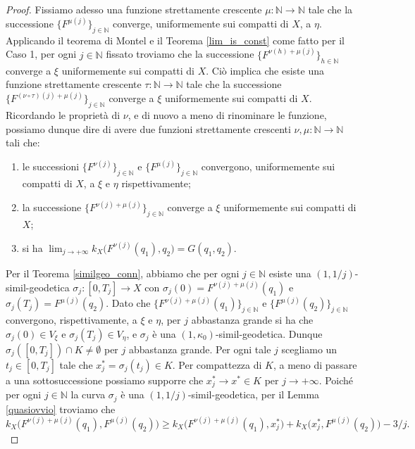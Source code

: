 \begin{proof}
    Fissiamo adesso una funzione strettamente crescente $\mu:\mathbb{N}\longrightarrow\mathbb{N}$ tale che la successione $\{F^{\mu(j)}\}_{j\in\mathbb{N}}$ converge, uniformemente sui compatti di $X$, a $\eta$. Applicando il teorema di Montel e il Teorema \ref{lim_is_const} come fatto per il Caso 1, per ogni $j\in\mathbb{N}$ fissato troviamo che la successione $\{F^{\nu(h)+\mu(j)}\}_{h\in\mathbb{N}}$ converge a $\xi$ uniformemente sui compatti di $X$. Ciò implica che esiste una funzione strettamente crescente $\tau:\mathbb{N}\longrightarrow\mathbb{N}$ tale che la successione $\{F^{(\nu\circ\tau)(j)+\mu(j)}\}_{j\in\mathbb{N}}$ converge a $\xi$ uniformemente sui compatti di $X$. Ricordando le proprietà di $\nu$, e di nuovo a meno di rinominare le funzione, possiamo dunque dire di avere due funzioni strettamente crescenti $\nu,\mu:\mathbb{N}\longrightarrow\mathbb{N}$ tali che:
    \begin{enumerate}[label={(\arabic*)}]
        \item le successioni $\{F^{\nu(j)}\}_{j\in\mathbb{N}}$ e $\{F^{\mu(j)}\}_{j\in\mathbb{N}}$ convergono, uniformemente sui compatti di $X$, a $\xi$ e $\eta$ rispettivamente;
        \item la successione $\{F^{\nu(j)+\mu(j)}\}_{j\in\mathbb{N}}$ converge a $\xi$ uniformemente sui compatti di $X$;
        \item si ha $\displaystyle\lim_{j\longrightarrow+\infty}k_X\big(F^{\nu(j)}(q_1),q_2\big)=G(q_1,q_2)$.
    \end{enumerate}

    Per il Teorema \ref{similgeo_conn}, abbiamo che per ogni $j\in\mathbb{N}$ esiste una $(1,1/j)$-simil-geodetica $\sigma_j:[0,T_j]\longrightarrow X$ con $\sigma_j(0)=F^{\nu(j)+\mu(j)}(q_1)$ e $\sigma_j(T_j)=F^{\mu(j)}(q_2)$. Dato che $\{F^{\nu(j)+\mu(j)}(q_1)\}_{j\in\mathbb{N}}$ e $\{F^{\mu(j)}(q_2)\}_{j\in\mathbb{N}}$ convergono, rispettivamente, a $\xi$ e $\eta$, per $j$ abbastanza grande si ha che $\sigma_j(0)\in V_\xi$ e $\sigma_j(T_j)\in V_\eta$, e $\sigma_j$ è una $(1,\kappa_0)$-simil-geodetica. Dunque $\sigma_j([0,T_j])\cap K\not=\emptyset$ per $j$ abbastanza grande. Per ogni tale $j$ scegliamo un $t_j\in[0,T_j]$ tale che $x_j^*=\sigma_j(t_j)\in K$. Per compattezza di $K$, a meno di passare a una sottosuccessione possiamo supporre che $x_j^* \longrightarrow x^* \in K$ per $j\longrightarrow+\infty$. Poiché per ogni $j\in\mathbb{N}$ la curva $\sigma_j$ è una $(1,1/j)$-simil-geodetica, per il Lemma \ref{quasiovvio} troviamo che
    \begin{equation} \label{trejay}
        k_X\big(F^{\nu(j)+\mu(j)}(q_1),F^{\mu(j)}(q_2)\big) \ge k_X\big(F^{\nu(j)+\mu(j)}(q_1),x_j^*\big)+k_X\big(x_j^*,F^{\mu(j)}(q_2)\big)-3/j.
    \end{equation}


\end{proof}
